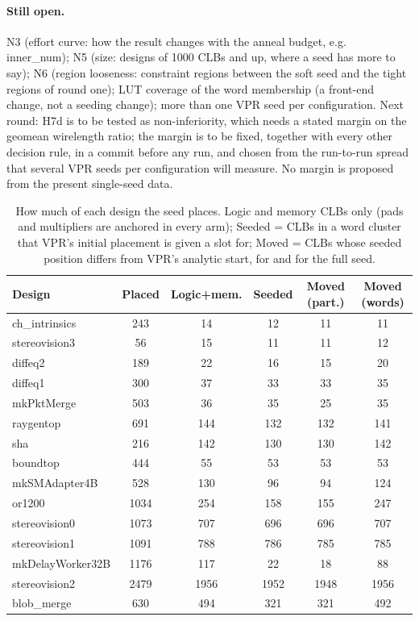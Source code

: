 \paragraph{Still open.} N3 (effort curve: how the result changes with the anneal budget, e.g. inner\_num);
N5 (size: designs of 1000 CLBs and up, where a seed has more to say); N6 (region looseness: constraint
regions between the soft seed and the tight regions of round one); LUT coverage of the word membership
(a front-end change, not a seeding change); more than one VPR seed per configuration.
Next round: H7d is to be tested as non-inferiority, which needs a stated margin on the geomean wirelength ratio; the
margin is to be fixed, together with every other decision rule, in a commit before any run, and chosen from the
run-to-run spread that several VPR seeds per configuration will measure. No margin is proposed from the present
single-seed data.

\begin{table}[t]
\caption{How much of each design the  seed places. Logic and memory CLBs only (pads and multipliers are
anchored in every arm); Seeded = CLBs in a word cluster that VPR's initial placement is given a slot for; Moved = CLBs whose seeded
position differs from VPR's analytic start, for  and for the full  seed.}
\label{tab:r2partial}
\centering
\scriptsize\setlength{\tabcolsep}{2pt}
\begin{tabular}{lccccc}
\toprule
Design & Placed & Logic+mem. & Seeded & Moved (part.) & Moved (words) \\
\midrule
ch\_intrinsics & 243 & 14 & 12 & 11 & 11 \\
stereovision3 & 56 & 15 & 11 & 11 & 12 \\
diffeq2 & 189 & 22 & 16 & 15 & 20 \\
diffeq1 & 300 & 37 & 33 & 33 & 35 \\
mkPktMerge & 503 & 36 & 35 & 25 & 35 \\
raygentop & 691 & 144 & 132 & 132 & 141 \\
sha & 216 & 142 & 130 & 130 & 142 \\
boundtop & 444 & 55 & 53 & 53 & 53 \\
mkSMAdapter4B & 528 & 130 & 96 & 94 & 124 \\
or1200 & 1034 & 254 & 158 & 155 & 247 \\
stereovision0 & 1073 & 707 & 696 & 696 & 707 \\
stereovision1 & 1091 & 788 & 786 & 785 & 785 \\
mkDelayWorker32B & 1176 & 117 & 22 & 18 & 88 \\
stereovision2 & 2479 & 1956 & 1952 & 1948 & 1956 \\
blob\_merge & 630 & 494 & 321 & 321 & 492 \\
\bottomrule
\end{tabular}
\end{table}


